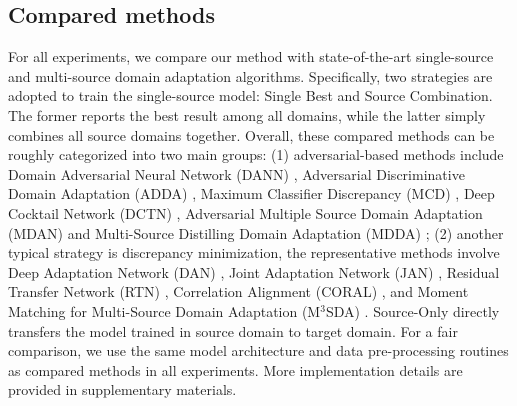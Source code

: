 \documentclass[10pt,twocolumn,letterpaper]{article}
\begin{document}
\subsection{Compared methods}
For all experiments, we compare our method with state-of-the-art single-source and multi-source domain adaptation algorithms. Specifically, two strategies are adopted to train the single-source model: Single Best and Source Combination. The former reports the best result among all domains, while the latter simply combines all source domains together. Overall, these compared methods can be roughly categorized into two main groups: (1) adversarial-based methods include Domain Adversarial Neural Network (DANN) \cite{ganin2016domain}, Adversarial Discriminative Domain Adaptation (ADDA) \cite{tzeng2017adversarial}, Maximum Classifier Discrepancy (MCD) \cite{saito2018maximum}, Deep Cocktail Network (DCTN) \cite{xu2018deep}, Adversarial Multiple Source Domain Adaptation (MDAN) \cite{zhao2018adversarial} and Multi-Source Distilling Domain Adaptation (MDDA) \cite{zhao2020multi}; (2) another typical strategy is discrepancy minimization, the representative methods involve Deep Adaptation Network (DAN) \cite{long2015learning}, Joint Adaptation Network (JAN) \cite{long2017deep}, Residual Transfer Network (RTN) \cite{long2016unsupervised}, Correlation Alignment (CORAL) \cite{sun2017correlation}, and Moment Matching for Multi-Source Domain Adaptation (M$^3$SDA) \cite{peng2019moment}. Source-Only directly transfers the model trained in source domain to target domain. For a fair comparison, we use the same model architecture and data pre-processing routines as compared methods in all experiments. More implementation details are provided in supplementary materials.
\end{document}
